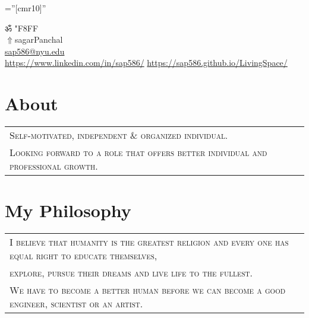 \documentclass[a4paper]{article}
\newcommand{\apple}{\char"F8FF}
\begin{document}
\pagestyle{empty} 						%
\font\fb=''[cmr10]'' 						%

\par	{\centering
	ॐ
	{\setmainfont{Apple Chancery} \apple}																														\\
	\href{https://sap586.github.io/LivingSpace/}{$ \Uparrow$}{sagarPanchal}																								\\
	\small \href{mailto:sap586@nyu.edu}{sap586@nyu.edu}														\\
	\small \href{https://www.linkedin.com/in/sap586/}{https://www.linkedin.com/in/sap586/}		\textbullet \href{https://sap586.github.io/LivingSpace/}{https://sap586.github.io/LivingSpace/}		\par}
	
\section	{	About		}

	\begin{tabular}{lr}
		\textsc{	Self-motivated, independent \& organized individual.																}\\
		\textsc{	Looking forward to a role that offers better individual and professional growth.																}
	\end{tabular}
	\begin{spacing}{0.5}
	\end{spacing}

	
\section	{	My Philosophy		}

	\begin{tabular}{lr}
		\textsc{	I believe that humanity is the greatest religion and every one has equal right to educate themselves,													}\\
		\textsc{	explore, pursue their dreams and live life to the fullest.		}\\
		\textsc{	We have to become a better human before we can become a good engineer, scientist or an artist.													}
	\end{tabular}
	\begin{spacing}{0.5}
	\end{spacing}
\end{document}

